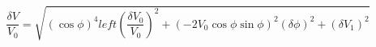 \begin{equation}
\label{eq:delta_V_Malus}
\frac{\delta V}{V_0} = \sqrt{ {\left(\cos{\phi}\right)}^4left(\frac{\delta V_0}{V_0})^2 + \left(-2 V_0 \cos{\phi}\sin{\phi} \right)^2(\delta \phi)^2+ (\delta V_1)^2}
\end{equation}